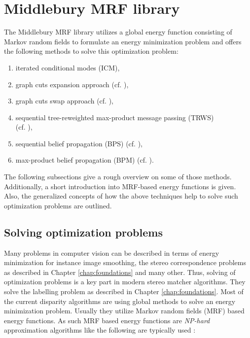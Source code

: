 \section{Middlebury MRF library}

The Middlebury MRF library \citep{scharstein2014high, szeliski2008comparative} utilizes a global energy function consisting of Markov random fields to formulate an energy minimization problem and offers the following methods to solve this optimization problem:

\begin{enumerate}
  \item iterated conditional modes (ICM),
  \item graph cuts expansion approach (cf. \citep{boykov2001fast, ramin2004energy, kolmogorov2004energy}),
  \item graph cuts swap approach (cf. \citep{boykov2001fast, ramin2004energy, kolmogorov2004energy}),
  \item sequential tree-reweighted max-product message passing (TRWS)\\(cf. \citep{kolmogorov2006convergent, wainwright2005map}),
  \item sequential belief propagation (BPS) (cf. \citep{boykov2001fast}),
  \item max-product belief propagation (BPM) (cf. \citep{boykov2001fast}).
\end{enumerate}

\noindent The following subsections give a rough overview on some of those methods.
Additionally, a short introduction into MRF-based energy functions is given.
Also, the generalized concepts of how the above techniques help to solve such optimization problems are outlined.

\subsection{Solving optimization problems}

Many problems in computer vision can be described in terms of energy minimization for instance image smoothing, the stereo correspondence problems as described in Chapter \ref{chap:foundations} and many other.
Thus, solving of optimization problems is a key part in modern stereo matcher algorithms.
They solve the labelling problem as described in Chapter \ref{chap:foundations}.
Most of the current disparity algorithms are using global methods to solve an energy minimization problem.
Usually they utilize Markov random fields (MRF) based energy functions.
As such MRF based energy functions are \textit{NP-hard} approximation algorithms like the following are typically used \citep{tappen2003comparison, cyganek2011introduction}:

